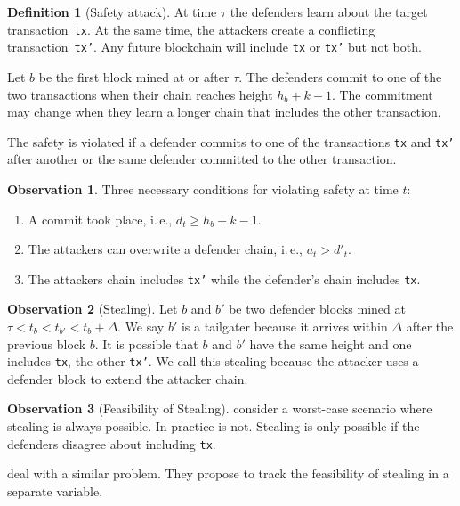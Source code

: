 \documentclass[12pt]{article}
\theoremstyle{definition}
\newtheorem{definition}{Definition}
\newtheorem{observation}{Observation}
\begin{document}
\begin{definition}[Safety attack] \label{def:safety2}
  At time $\tau$ the defenders learn about the target transaction~\texttt{tx}.
  At the same time, the attackers create a conflicting transaction~\texttt{tx'}.
  Any future blockchain will include \texttt{tx} or \texttt{tx'} but not both.

  Let $b$ be the first block mined at or after $\tau$.
  The defenders commit to one of the two transactions when their chain reaches height $h_b + k - 1$.
  The commitment may change when they learn a longer chain that includes the other transaction.

  The safety is violated if a defender commits to one of the transactions \texttt{tx} and \texttt{tx'} after another or the same defender committed to the other transaction.
\end{definition}

\begin{observation}
  Three necessary conditions for violating safety at time $t$:
  \begin{enumerate}
    \item A commit took place, i.\,e., $d_t \geq h_b + k - 1$.
    \item The attackers can overwrite a defender chain, i.\,e., $a_t > d'_t$.
    \item The attackers chain includes \texttt{tx'} while the defender's chain includes \texttt{tx}.
  \end{enumerate}
\end{observation}

\begin{observation}[Stealing]
  Let $b$ and $b'$ be two defender blocks mined at $\tau < t_b < t_{b'} < t_b + \Delta$.
  We say $b'$ is a tailgater because it arrives within $\Delta$ after the previous block $b$.
  It is possible that $b$ and $b'$ have the same height and one includes \texttt{tx}, the other \texttt{tx'}.
  We call this stealing because the attacker uses a defender block to extend the attacker chain.
\end{observation}

\begin{observation}[Feasibility of Stealing]
  \citet{guo2022BitcoinLatency} consider a worst-case scenario where stealing is always possible.
  In practice is not. Stealing is only possible if the defenders disagree about including \texttt{tx}.
\end{observation}

\citet{keller2022ParallelProofofwork} deal with a similar problem.
They propose to track the feasibility of stealing in a separate variable.
\end{document}
